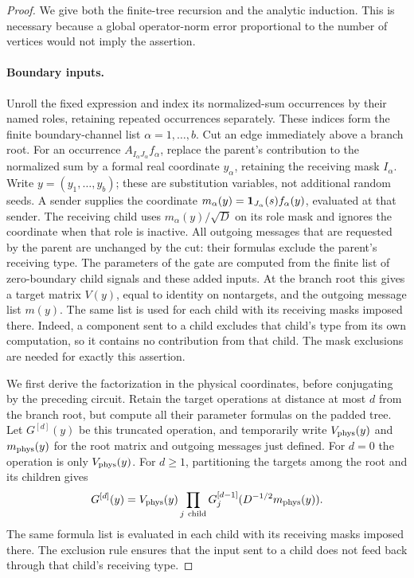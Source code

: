 \begin{proof}
We give both the finite-tree recursion and the analytic
induction.  This is necessary because a global operator-norm
error proportional to the number of vertices would not imply
the assertion.

\paragraph{Boundary inputs.}
Unroll the fixed expression and index its normalized-sum occurrences
by their named roles, retaining repeated occurrences separately.
These indices form the finite boundary-channel list
$\alpha=1,\ldots,b$.  Cut an edge immediately above a branch root.
For an occurrence $A_{I_\alpha J_\alpha}f_\alpha$, replace the
parent's contribution to the normalized sum by a formal real
coordinate $y_\alpha$, retaining the receiving mask $I_\alpha$.
Write $y=(y_1,\ldots,y_b)$; these are substitution variables,
not additional random seeds.  A sender supplies the coordinate
$m_\alpha(y)=\mathbf 1_{J_\alpha}(s)f_\alpha(y)$, evaluated at that
sender.  The receiving child uses $m_\alpha(y)/\sqrt D$ on its
role mask and ignores the coordinate when that role is inactive.
All outgoing messages that are
requested by the parent are unchanged by the cut: their
formulas exclude the parent's receiving type.  The parameters
of the gate are computed from the finite list of zero-boundary
child signals and these added inputs.  At the branch root this
gives a target matrix $V(y)$, equal to identity on nontargets,
and the outgoing message list $m(y)$.  The same list is
used for each child with its receiving masks imposed there.
Indeed, a component sent to a child excludes that child's
type from its own computation, so it contains no contribution
from that child.  The mask exclusions are needed for exactly
this assertion.

We first derive the factorization in the physical coordinates, before
conjugating by the preceding circuit. Retain the target operations at
distance at most $d$ from the branch root, but compute all their
parameter formulas on the padded tree. Let $G^{[d]}(y)$ be this
truncated operation, and temporarily write $V_{\rm phys}(y)$ and
$m_{\rm phys}(y)$ for the root matrix and outgoing messages just
defined. For $d=0$ the operation is only $V_{\rm phys}(y)$. For
$d\geq1$, partitioning the targets among the root and its children gives
\[
 G^{[d]}(y)=V_{\rm phys}(y)
       \prod_{j\ \mathrm{child}}
       G_j^{[d-1]}(D^{-1/2}m_{\rm phys}(y)).
\]
The same formula list is evaluated in each child with its receiving
masks imposed there. The exclusion rule ensures that the input sent
to a child does not feed back through that child's receiving type.


\end{proof}
